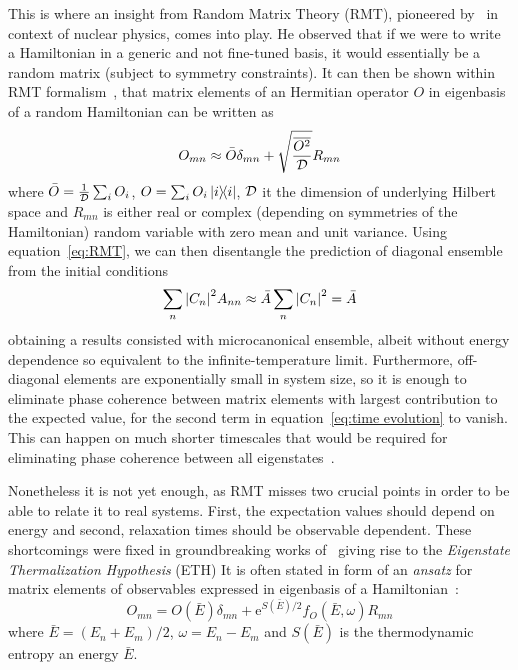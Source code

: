 This is where an insight from Random Matrix Theory (RMT), pioneered by~\textcite{Wigner1955}
in context of nuclear physics, comes into play. He observed that if we were to write
a Hamiltonian in a generic and not fine-tuned basis, it would essentially be a random matrix
(subject to symmetry constraints). It can then be shown within RMT formalism~\autocite{mehta2004random},
that matrix elements of an Hermitian operator \(O\) in eigenbasis of a random Hamiltonian 
can be written as
\begin{equation}
    O_{mn} \approx \bar{O}\delta_{mn} + \sqrt{\frac{\overline{O^2}}{\mathcal{D}}}R_{mn}
    \label{eq:RMT}
\end{equation}
where \(\bar{O} = \frac{1}{\mathcal{D}}\sum_i O_i\), \(O = \sum_i O_i \ketbra{i}{i}\), \(\mathcal{D}\)
it the dimension of underlying Hilbert space and \(R_{mn}\) is either real or complex (depending on symmetries of the Hamiltonian) random
variable with zero mean and unit variance. Using equation~\eqref{eq:RMT}, we can then 
disentangle the prediction of diagonal ensemble from the initial conditions
\begin{equation}
    \sum_{n}\abs{C_n}^2 A_{nn} \approx \bar{A}\sum_{n}\abs{C_n}^2 = \bar{A}
\end{equation}
obtaining a results consisted with microcanonical ensemble, albeit without energy dependence
so equivalent to the infinite-temperature limit. Furthermore, off-diagonal elements are exponentially
small in system size, so it is enough to eliminate phase coherence between matrix elements with
largest contribution to the expected value, for the second term in equation~\eqref{eq:time evolution}
to vanish. This can happen on much shorter timescales that would be required for eliminating
phase coherence between all eigenstates~\autocite{DAlessio2016}.

Nonetheless it is not yet enough, as RMT misses two crucial points in order to be able to relate
it to real systems. First, the expectation values should depend on energy and second, relaxation
times should be observable dependent. These shortcomings were fixed in groundbreaking works
of~\textcite{Deutsch19912046,Srednicki1994} giving rise to the \textit{Eigenstate Thermalization Hypothesis} (ETH)
It is often stated in form of an \textit{ansatz} for matrix elements of observables expressed in
eigenbasis of a Hamiltonian~\autocite{Srednicki1999}:
\begin{equation}
    O_{mn} = O(\bar{E}) \delta_{mn} + \mathrm{e}^{S(\bar{E})/2}f_{O}(\bar{E},\omega)R_{mn}
    \label{eq:ETH}
\end{equation}
where \(\bar{E} = (E_n+E_m)/2\), \(\omega=E_n-E_m\) and \(S(\bar{E})\) is the thermodynamic
entropy an energy \(\bar{E}\).

